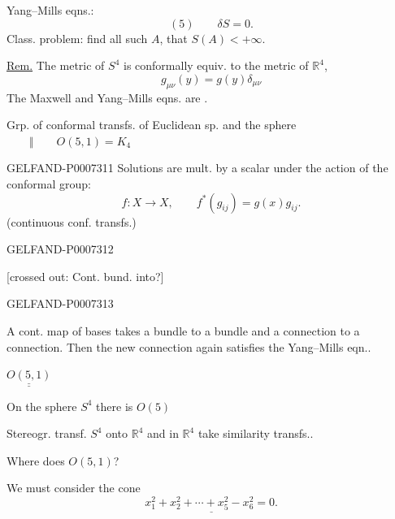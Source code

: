 Yang--Mills eqns.:
\[
(5)\qquad \delta S=0.
\]
Class. problem: find all such \(A\), that \(S(A)<+\infty\).

\underline{Rem.} The metric of \(S^4\) is conformally equiv. to the metric of \(\mathbb R^4\),
\[
g_{\mu\nu}(y)=g(y)\delta_{\mu\nu}
\]
The Maxwell and Yang--Mills eqns. are .

Grp. of conformal transfs. of Euclidean sp. and the sphere \(\qquad\Vert\qquad O(5,1)=K_4\)


\begin{GelfandAdjacentEvidence}{GELFAND-P000731}{1}
Solutions are mult. by a scalar under the action of the conformal group:
\[
f:X\longrightarrow X,\qquad f^*(g_{ij})=g(x)g_{ij}.
\]
(continuous conf. transfs.)
\end{GelfandAdjacentEvidence}
\begin{GelfandAdjacentEvidence}{GELFAND-P000731}{2}


[crossed out: Cont. bund. into?]
\end{GelfandAdjacentEvidence}
\begin{GelfandAdjacentEvidence}{GELFAND-P000731}{3}


A cont. map of bases takes a bundle to a bundle and a connection to a connection.
Then the new connection again satisfies the Yang--Mills eqn..

\(\underline{\underline{O(5,1)}}\)

On the sphere \(S^4\) there is \(O(5)\)

Stereogr. transf. \(S^4\) onto \(\mathbb R^4\) and in \(\mathbb R^4\) take similarity transfs..

Where does \(O(5,1)\)?

We must consider the cone
\[
\underline{x_1^2+x_2^2+\cdots+x_5^2-x_6^2=0.}
\]
\end{GelfandAdjacentEvidence}
